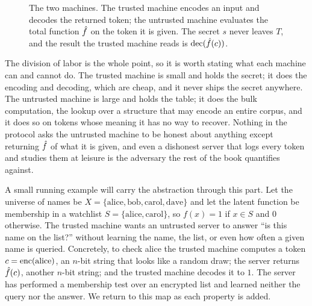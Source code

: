 \begin{figure}[t]
\centering
{}
\caption{The two machines. The trusted machine encodes an input and decodes
the returned token; the untrusted machine evaluates the total function
$\hat{f}$ on the token it is given. The secret $s$ never leaves $T$, and the
result the trusted machine reads is $\operatorname{dec}(\hat{f}(c))$.}
\label{fig:two-machines}
\end{figure}

The division of labor is the whole point, so it is worth stating what each
machine can and cannot do. The trusted machine is small and holds the
secret; it does the encoding and decoding, which are cheap, and it never
ships the secret anywhere. The untrusted machine is large and holds the
table; it does the bulk computation, the lookup over a structure that may
encode an entire corpus, and it does so on tokens whose meaning it has no
way to recover. Nothing in the protocol asks the untrusted machine to be
honest about anything except returning $\hat{f}$ of what it is given, and
even a dishonest server that logs every token and studies them at leisure
is the adversary the rest of the book quantifies against.

\begin{example}[A watchlist]
\label{ex:watchlist}
A small running example will carry the abstraction through this part. Let
the universe of names be $X = \{\mathrm{alice}, \mathrm{bob},
\mathrm{carol}, \mathrm{dave}\}$ and let the latent function be membership
in a watchlist $S = \{\mathrm{alice}, \mathrm{carol}\}$, so $f(x) = 1$ if
$x \in S$ and $0$ otherwise. The trusted machine wants an untrusted server
to answer ``is this name on the list?'' without learning the name, the
list, or even how often a given name is queried. Concretely, to check
alice the trusted machine computes a token $c = \operatorname{enc}(\mathrm{alice})$, an
$n$-bit string that looks like a random draw; the server returns $\hat{f}(c)$,
another $n$-bit string; and the trusted machine decodes it to $1$. The
server has performed a membership test over an encrypted list and learned
neither the query nor the answer. We return to this map as each property is
added.
\end{example}


